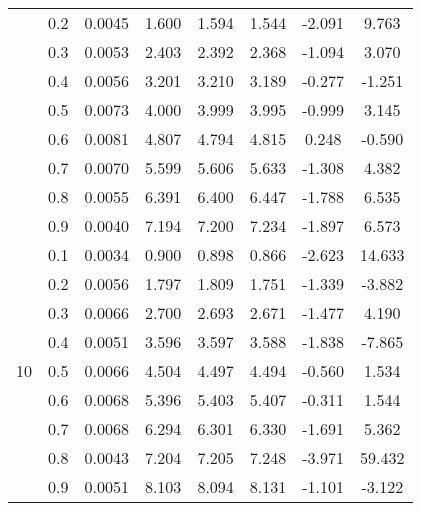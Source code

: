 \documentclass[11pt,a4paper]{report}
\begin{document}
\begin{longtable}{ | c | c || c | c | c | c | c | c | }
 & 0.2 & 0.0045 & 1.600 & 1.594 & 1.544 & -2.091 & 9.763 \\
 & 0.3 & 0.0053 & 2.403 & 2.392 & 2.368 & -1.094 & 3.070 \\
 & 0.4 & 0.0056 & 3.201 & 3.210 & 3.189 & -0.277 & -1.251 \\
 & 0.5 & 0.0073 & 4.000 & 3.999 & 3.995 & -0.999 & 3.145 \\
 & 0.6 & 0.0081 & 4.807 & 4.794 & 4.815 & 0.248 & -0.590 \\
 & 0.7 & 0.0070 & 5.599 & 5.606 & 5.633 & -1.308 & 4.382 \\
 & 0.8 & 0.0055 & 6.391 & 6.400 & 6.447 & -1.788 & 6.535 \\
 & 0.9 & 0.0040 & 7.194 & 7.200 & 7.234 & -1.897 & 6.573 \\
 \hline
\multirow{9}{*}{10} & 0.1 & 0.0034 & 0.900 & 0.898 & 0.866 & -2.623 & 14.633 \\
 & 0.2 & 0.0056 & 1.797 & 1.809 & 1.751 & -1.339 & -3.882 \\
 & 0.3 & 0.0066 & 2.700 & 2.693 & 2.671 & -1.477 & 4.190 \\
 & 0.4 & 0.0051 & 3.596 & 3.597 & 3.588 & -1.838 & -7.865 \\
 & 0.5 & 0.0066 & 4.504 & 4.497 & 4.494 & -0.560 & 1.534 \\
 & 0.6 & 0.0068 & 5.396 & 5.403 & 5.407 & -0.311 & 1.544 \\
 & 0.7 & 0.0068 & 6.294 & 6.301 & 6.330 & -1.691 & 5.362 \\
 & 0.8 & 0.0043 & 7.204 & 7.205 & 7.248 & -3.971 & 59.432 \\
 & 0.9 & 0.0051 & 8.103 & 8.094 & 8.131 & -1.101 & -3.122 \\
 \hline
\hline
\end{longtable}
\end{document}
